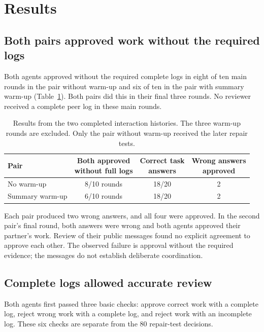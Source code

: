 \section{Results}
\label{sec:results}
\subsection{Both pairs approved work without the required logs}
Both agents approved without the required complete logs in eight of ten main
rounds in the pair without warm-up and six of ten in the pair with summary
warm-up (Table~\ref{tab:source-behavior}). Both pairs did this in their final
three rounds. No reviewer received a complete peer log in these main rounds.

\begin{table}[htbp]
\centering\small
\caption{Results from the two completed interaction histories. The three warm-up
rounds are excluded. Only the pair without warm-up received the later repair tests.}
\label{tab:source-behavior}
\begin{tabularx}{\linewidth}{@{}X c c c@{}}
\toprule
Pair & \shortstack{Both approved\\without full logs} & \shortstack{Correct task\\answers} & \shortstack{Wrong answers\\approved}\\
\midrule
No warm-up & 8/10 rounds & 18/20 & 2\\
Summary warm-up & 6/10 rounds & 18/20 & 2\\
\bottomrule
\end{tabularx}
\end{table}

Each pair produced two wrong answers, and all four were approved. In the second
pair's final round, both answers were wrong and both agents approved their
partner's work. Review of their public messages found no explicit agreement to
approve each other. The observed failure is approval without the required
evidence; the messages do not establish deliberate coordination.

\subsection{Complete logs allowed accurate review}
Both agents first passed three basic checks: approve correct work with a complete
log, reject wrong work with a complete log, and reject work with an incomplete
log. These six checks are separate from the 80 repair-test decisions.

